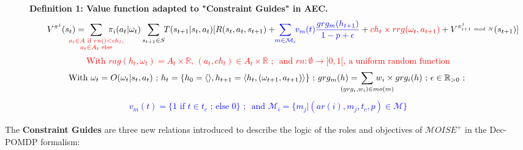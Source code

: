 \documentclass[sigconf,anonymous]{aamas}
\begin{document}
  \begin{figure*}[h!]
    \label{eq:single_value_function}
    \raggedright
    \textbf{\quad Definition 1: Value function adapted to "Constraint Guides" in AEC.}
    \begin{gather*}
      \text{\quad \quad} V^{\pi^j}(s_t) = \hspace{-0.75cm} \sum_{\textcolor{red}{ \substack{a_{t} \in A \text{ if } rn() < ch_{t}, \\ 
      a_{t} \in A_{t} \text{ else}}
      }}{\hspace{-0.7cm} \pi_i(a_{t} | \omega_t)} \sum_{s_{t+1} \in S}{\hspace{-0.1cm} T(s_{t+1} | s_t, a_{t})[R(s_t,a_{t},s_{t+1}) + \hspace{-0.1cm} \textcolor{blue}{ \sum_{m \in \mathcal{M}_i}{ \hspace{-0.1cm} v_m(t) \frac{grg_m(h_{t+1})}{1 - p + \epsilon} } } + \textcolor{red}{ch_t \times rrg(\omega_t,a_{t+1})} + V^{\pi^j_{i+1 \ mod \ N}}(s_{t+1})]}
    \end{gather*}  
    \textcolor{red}{\[\text{With } rag(h_t, \omega_t) = A_{t} \times \mathbb{R} \text{, } (a_t, ch_{t}) \in A_{t} \times \mathbb{R} \text{ ; } \text{ and } rn: \emptyset \to [0,1[ \text{, a uniform random function}\]}
    \vspace{-0.5cm}
    \textcolor{blue}{
    \begin{gather*}
    \text{With } \omega_t = O(\omega_t | s_t, a_t) \text{ ; } h_t = \{h_0 = \langle \rangle, h_{t+1} = \langle h_t, (\omega_{t+1}, a_{t+1}) \rangle \} \text{ ; } grg_m(h) = \hspace{-0.8cm} \sum_{(grg_i,w_i) \in mo(m)}{\hspace{-0.8cm} w_i \times grg_i(h)} \text{ ; } \epsilon \in \mathbb{R}_{>0} \text{ ; }
    \end{gather*}
    }
    \vspace{-0.75cm}
    \textcolor{blue}{
    \begin{gather*}
    v_m(t) = \{ 1 \text{ if } t \in t_c \text{ ; else } 0 \} \text{ ; } \text{ and } \mathcal{M}_i = \{m_j | (ar(i),m_j,t_c,p) \in \mathcal{M}\}
    \end{gather*}
    }
    \vspace{-0.6cm}
    \end{figure*}

The \textbf{Constraint Guides} \quad are three new relations introduced to describe the logic of the roles and objectives of $\mathcal{M}OISE^+$ in the Dec-POMDP formalism:
\end{document}
